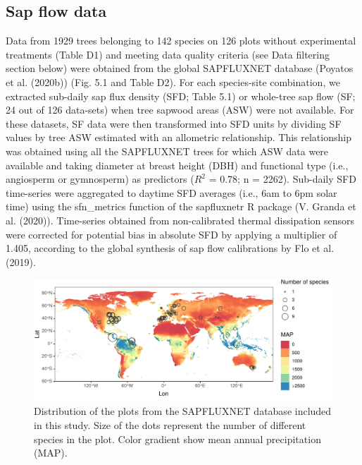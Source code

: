 \documentclass[11pt,twoside]{reedthesis}
\begin{document}
\subsection{Sap flow data}\label{sap-flow-data}

Data from 1929 trees belonging to 142 species on 126 plots without
experimental treatments (Table D1) and meeting data quality criteria
(see Data filtering section below) were obtained from the global
SAPFLUXNET database (Poyatos et al. (2020b)) (Fig. 5.1 and Table D2).
For each species-site combination, we extracted sub-daily sap flux
density (SFD; Table 5.1) or whole-tree sap flow (SF; 24 out of 126
data-sets) when tree sapwood areas (ASW) were not available. For these
datasets, SF data were then transformed into SFD units by dividing SF
values by tree ASW estimated with an allometric relationship. This
relationship was obtained using all the SAPFLUXNET trees for which ASW
data were available and taking diameter at breast height (DBH) and
functional type (i.e., angiosperm or gymnosperm) as predictors (\(R^2\)
= 0.78; n = 2262). Sub-daily SFD time-series were aggregated to daytime
SFD averages (i.e., 6am to 6pm solar time) using the sfn\_metrics
function of the sapfluxnetr R package (V. Granda et al. (2020)).
Time-series obtained from non-calibrated thermal dissipation sensors
were corrected for potential bias in absolute SFD by applying a
multiplier of 1.405, according to the global synthesis of sap flow
calibrations by Flo et al. (2019).\par
\begin{figure}[hbt!]

{\centering \includegraphics[width=1\linewidth]{figure/CH5/Figure_1} 

}

\caption[Distribution of the plots from the SAPFLUXNET database included in this study.]{Distribution of the plots from the SAPFLUXNET database included in this study. Size of the dots represent the number of different species in the plot. Color gradient show mean annual precipitation (MAP).}\label{fig:ch5fig1}
\end{figure}
\end{document}
